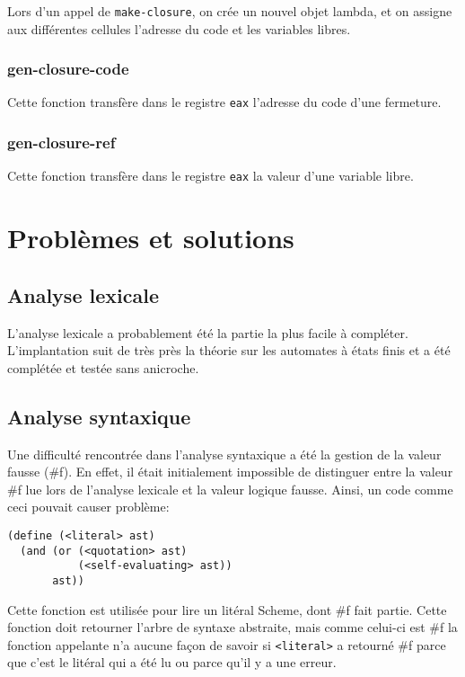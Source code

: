 \documentclass[11pt]{report}
\begin{document}
Lors d'un appel de {\tt make-closure}, on crée un nouvel objet lambda,
et on assigne aux différentes cellules l'adresse du code et les
variables libres.


\subsection{gen-closure-code}

Cette fonction transfère dans le registre {\tt eax} l'adresse du code
d'une fermeture.


\subsection{gen-closure-ref}

Cette fonction transfère dans le registre {\tt eax} la valeur d'une
variable libre.



\chapter{Problèmes et solutions}

\section{Analyse lexicale}

L'analyse lexicale a probablement été la partie la plus facile à
compléter. L'implantation suit de très près la théorie sur les
automates à états finis et a été complétée et testée sans anicroche.

\section{Analyse syntaxique}

Une difficulté rencontrée dans l'analyse syntaxique a été la gestion
de la valeur fausse (\#f).  En effet, il était initialement impossible
de distinguer entre la valeur \#f lue lors de l'analyse lexicale et la
valeur logique fausse.  Ainsi, un code comme ceci pouvait causer
problème:


\begin{verbatim}
(define (<literal> ast)
  (and (or (<quotation> ast)
           (<self-evaluating> ast))
       ast))
\end{verbatim}

Cette fonction est utilisée pour lire un litéral Scheme, dont \#f fait
partie.  Cette fonction doit retourner l'arbre de syntaxe abstraite,
mais comme celui-ci est \#f la fonction appelante n'a aucune façon de
savoir si {\tt <literal>} a retourné \#f parce que c'est le litéral
qui a été lu ou parce qu'il y a une erreur.
\end{document}
